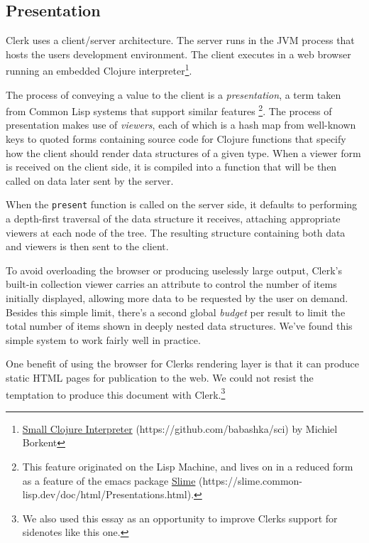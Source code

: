 \documentclass[sigconf,screen]{acmart}
\newcommand{\passthrough}[1]{#1}
\begin{document}
\hypertarget{presentation}{%
\subsection{Presentation}\label{presentation}}

Clerk uses a client/server architecture. The server runs in the JVM process that hosts the user\textquotesingle s development environment. The client executes in a web browser running an embedded Clojure interpreter\footnote{{\href{https://github.com/babashka/sci}{Small Clojure Interpreter} (https://github.com/babashka/sci)} by Michiel Borkent}.

The process of conveying a value to the client is a \emph{presentation}, a
term taken from Common Lisp systems that support similar features \footnote{This feature originated on the Lisp Machine, and lives on in a reduced form as a feature of the emacs package {\href{https://slime.common-lisp.dev/doc/html/Presentations.html}{Slime} (https://slime.common-lisp.dev/doc/html/Presentations.html)}.}. The process of presentation makes use of \emph{viewers}, each of which is a hash map from well-known keys to quoted forms containing source code for Clojure functions that specify how the client should render data structures of a given type. When a viewer form is received on the client side, it is compiled into a function that will be then called on data later sent by the server.

When the \passthrough{\lstinline!present!} function is called on the server side, it defaults to performing a depth-first traversal of the data structure it receives, attaching appropriate viewers at each node of the tree. The resulting structure containing both data and viewers is then sent to the client.

To avoid overloading the browser or producing uselessly large output, Clerk's built-in collection viewer carries an attribute to control the number of items initially displayed, allowing more data to be requested by the user on demand. Besides this simple limit, there's a second global \emph{budget} per result to limit the total number of items shown in deeply nested data structures. We've found this simple system to work fairly well in practice.

One benefit of using the browser for Clerk\textquotesingle s rendering layer is that it can produce static HTML pages for publication to the web. We could not resist the temptation to produce this document with Clerk.\footnote{We also used this essay as an opportunity to improve Clerk\textquotesingle s support for sidenotes like this one.}
\end{document}
